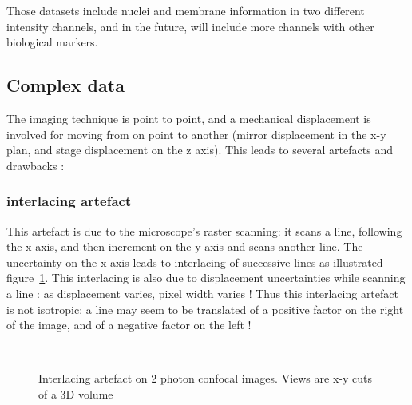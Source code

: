 Those datasets include nuclei and membrane information in two different intensity channels, and in the future, will include more channels with other biological markers. 


\subsection{Complex data}

The imaging technique is point to point, and a mechanical displacement is involved for moving from on point to another (mirror displacement in the x-y plan, and stage displacement on the z axis). This leads to several artefacts and drawbacks :

\subsubsection{interlacing artefact}
This artefact is due to the microscope's raster scanning: it scans a line, following the x axis, and then increment on the y axis and scans another line.
The uncertainty on the x axis leads to interlacing of successive lines as illustrated figure~\ref{fig:InterlacingArtefact}.
This interlacing is also due to displacement uncertainties while scanning a line : as displacement varies, pixel width varies !
Thus this interlacing artefact is not isotropic: a line may seem to be translated of a positive factor on the right of the image, and of a negative factor on the left !
\begin{figure}[htb]
  \centering
  \\
  \caption{Interlacing artefact on 2 photon confocal images. Views are x-y cuts of a 3D volume}
  \label{fig:InterlacingArtefact}
\end{figure}


